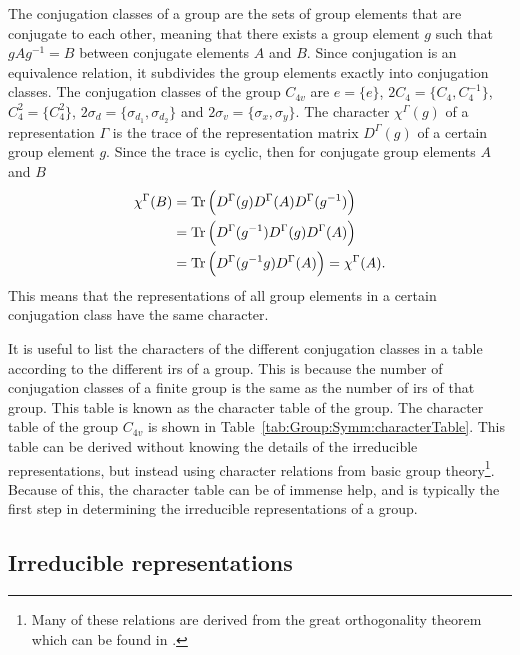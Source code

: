 The conjugation classes of a group are the sets of group elements that are conjugate to each other, meaning that there exists a group element $g$ such
that $gAg^{-1} = B$ between conjugate elements $A$ and $B$. Since conjugation is an equivalence relation, it subdivides the group elements
exactly into conjugation classes. The conjugation classes of the group $C_{4v}$ are $e = \{e\}$, $2C_4 = \{C_4,C_4^{-1}\}$, $C_4^2 = \{C_4^2\}$,
$2\sigma_d = \{\sigma_{d_1},\sigma_{d_2}\}$ and $2\sigma_v = \{\sigma_x,\sigma_y\}$. The character $\chi^\Gamma(g)$ of a representation $\Gamma$ is the trace of the representation
matrix $D^\Gamma(g)$ of a certain group element $g$. Since the trace is cyclic, then for conjugate group elements $A$ and $B$
\begin{equation}
    \label{eq:Group:Symm:conjugateCharacter}
    \begin{split}
        \chi^\Gamma(B) &= \operatorname{Tr}\Big(D^\Gamma(g)D^\Gamma(A)D^\Gamma(g^{-1})\Big)\\
        &= \operatorname{Tr}\Big(D^\Gamma(g^{-1})D^\Gamma(g)D^\Gamma(A)\Big)\\
        &= \operatorname{Tr}\Big(D^\Gamma(g^{-1}g)D^\Gamma(A)\Big) = \chi^\Gamma(A).
    \end{split}
\end{equation}
This means that the representations of all group elements in a certain conjugation class have the same character. 

It is useful to list the characters of the different conjugation classes in a table according to the different \ac{ir}s of a group.
This is because the number of conjugation classes of a finite group is the same as the number of \ac{ir}s of that group.
This table is known as the character table of the group. The character table of
the group $C_{4v}$ is shown in Table~\ref{tab:Group:Symm:characterTable}. This table can be derived without knowing the details of the irreducible
representations, but instead using character relations from basic group theory\footnote{Many of these relations are derived from the great orthogonality
theorem which can be found \eg in \cite{Inui90}.}. Because of this, the character table can be of immense help, and is typically the first step
in determining the irreducible representations of a group.

\subsection{Irreducible representations}

